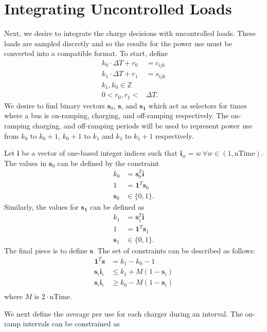 \section{Integrating Uncontrolled Loads}
Next, we desire to integrate the charge decisions with uncontrolled loads.  These loads are sampled discretly and so the results for the power use must be converted into a compatible format.  To start, define
\begin{align}
	k_0\cdot\Delta T + r_0&= c_{ijk} \\
	k_1\cdot\Delta T + r_1&= s_{ijk} \\
	k_1, k_0 \in \mathbb{Z} \\
	0 < r_0, r_1 < &\Delta T.
\end{align}
We desire to find binary vectors $\mathbf{s}_0$, $\mathbf{s}$, and $\mathbf{s_1}$ which act as selectors for times where a bus is on-ramping, charging, and off-ramping respectively. The on-ramping charging, and off-ramping periods will be used to represent power use from $k_0$ to $k_0 + 1$, $k_0 + 1$ to $k_1$ and $k_1$ to $k_1 + 1$ respectively. 
\par Let $\mathbf{i}$ be a vector of one-based integer indices such that $\mathbf{i}_w = w \ \forall w \in (1,\text{nTime})$. The values in $\mathbf{s}_0$ can be defined by the constraint
\begin{align}
	k_0 &= \mathbf{s}_0^T\mathbf{i} \\
	1 &= \mathbf{1}^T\mathbf{s}_0 \\
	\mathbf{s}_0 &\in \{0,1\}.
\end{align}
Similarly, the values for $\mathbf{s_1}$ can be defined as
\begin{align}
	k_1 &= \mathbf{s}_1^T\mathbf{i}\\
	1 &= \mathbf{1}^T\mathbf{s}_1 \\
	\mathbf{s}_1 &\in \{0,1\}.
\end{align}
The final piece is to define $\mathbf{s}$. The set of constraints can be described as follows: 
\begin{align}
	\mathbf{1}^T\mathbf{s} &= k_1 - k_0 - 1 \\
	\mathbf{s}_i\mathbf{i}_i &\le k_1 + M(1 - \mathbf{s}_i)\\
	\mathbf{s}_i\mathbf{i}_i &\ge k_0 - M(1 - \mathbf{s}_i)\\ 
\end{align}
where $M$ is $2\cdot\text{nTime}$.
\par We next define the average per use for each charger during an interval. The on-ramp intervals can be constrained as
